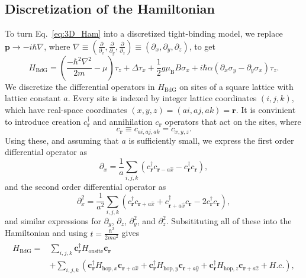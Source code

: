 \subsection{Discretization of the Hamiltonian}
To turn Eq.~\eqref{eq:3D_Ham} into a discretized tight-binding model, we replace $\bm{p} \rightarrow -i\hbar \nabla$, where $\nabla \equiv \left( \frac{\partial}{\partial_x}, \frac{\partial}{\partial_y}, \frac{\partial}{\partial_z} \right) \equiv \left( \partial_x, \partial_y, \partial_z \right)$, to get
\begin{equation}
H_{\textrm{BdG}}=\left(\frac{-\hbar^{2}\nabla^{2}}{2m}-\mu\right)\tau_{z}+\Delta\tau_{x}+\frac{1}{2}g\mu_{\textrm{B}}B\sigma_{x}+i\hbar\alpha\left(\partial_{x}\sigma_{y}-\partial_{y}\sigma_{x}\right)\tau_{z}.\label{eq:3D_Ham_again}
\end{equation}
We discretize the differential operators in $H_{\textrm{BdG}}$ on sites of a square lattice with lattice constant $a$.
Every site is indexed by integer lattice coordinates $(i,j,k)$, which have real-space coordinates $(x,y,z)=(ai,aj,ak)=\bm{r}$.
It is convinient to introduce creation $c^\dagger_{\bm{r}}$ and annihilation $c_{\bm{r}}$ operators that act on the sites, where
\begin{equation}
c_{\bm{r}} \equiv c_{ai, aj, ak} = c_{x, y, z}.
\end{equation}
Using these, and assuming that $a$ is sufficiently small, we express the first order differential operator as
\begin{equation}
\partial_{x} = \frac{1}{a}\sum_{i,j,k}\left(c^\dagger_{\bm{r}}c_{\bm{r}-a\hat{x}}-c^\dagger_{\bm{r}}c_{\bm{r}}\right),
\end{equation}
and the second order differential operator as
\begin{equation}
\partial_{x}^{2} = \frac{1}{a^{2}}\sum_{i,j,k}\left( c^\dagger_{\bm{r}}c_{\bm{r}+a\hat{x}}+c^\dagger_{\bm{r}+a\hat{x}}c_{\bm{r}}-2c^\dagger_{\bm{r}}c_{\bm{r}}\right),
\end{equation}
and similar expressions for $\partial_{y}$, $\partial_{z}$, $\partial_{y}^2$, and $\partial_{z}^2$.
Subsitituting all of these into the Hamiltonian and using $t = \frac{\hbar^2}{2 m a^2}$ gives
\begin{align}
\begin{aligned}
H_{\textrm{BdG}}= & \sum_{i,j,k}\bm{c}_{\bm{r}}^{\dagger}H_{\textrm{onsite}}\bm{c}_{\bm{r}} \\
                  & +\sum_{i,j,k}\left(\bm{c}_{\bm{r}}^{\dagger}H_{\textrm{hop},x}\bm{c}_{\bm{r}+a\hat{x}}+\bm{c}_{\bm{r}}^{\dagger}H_{\textrm{hop},y}\bm{c}_{\bm{r}+a\hat{y}}+\bm{c}_{\bm{r}}^{\dagger}H_{\textrm{hop},z}\bm{c}_{\bm{r}+a\hat{z}}+H.c.\right),
\end{aligned}
\end{align}
